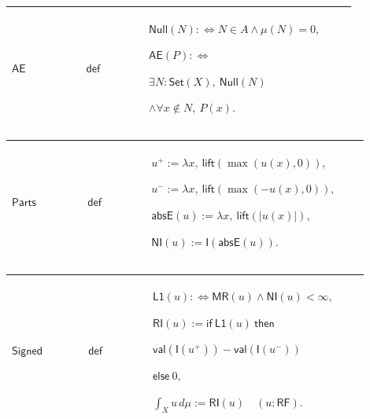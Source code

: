 \documentclass[12pt,reqno]{amsart}
\theoremstyle{blueplain}
\numberwithin{equation}{section}
\begin{document}
{\scriptsize \setlength{\parskip}{0pt}\nointerlineskip
\noindent 
\begin{tabular}{|@{}>{\centering\arraybackslash}m{0.19251\linewidth}|>{\centering\arraybackslash}m{0.16845\linewidth}|>{\centering\arraybackslash}m{0.53904\linewidth}|}
\hline
\hypertarget{dctdef:AE}{$\displaystyle \mathsf{AE}$} & $\displaystyle 
\mathsf{def}$ & $\displaystyle \mathsf{Null}(N):\Longleftrightarrow N\in
A\land\mu(N)=0,$\par$\displaystyle \mathsf{AE}(P):\Longleftrightarrow$\par$%
\displaystyle \exists N:\mathsf{Set}(X),\ \mathsf{Null}(N)$\par$%
\displaystyle \land\forall x\notin N,\ P(x).$ \\ \hline
\end{tabular}%
}

{\scriptsize \setlength{\parskip}{0pt}\nointerlineskip
\noindent 
\begin{tabular}{|@{}>{\centering\arraybackslash}m{0.19251\linewidth}|>{\centering\arraybackslash}m{0.16845\linewidth}|>{\centering\arraybackslash}m{0.53904\linewidth}|}
\hline
\hypertarget{dctdef:Parts}{$\displaystyle \mathsf{Parts}$} & $\displaystyle 
\mathsf{def}$ & $\displaystyle u^+:=\lambda x,\ \mathsf{lift}(\max(u(x),0)),$%
\par$\displaystyle u^-:=\lambda x,\ \mathsf{lift}(\max(-u(x),0)),$\par$%
\displaystyle \mathsf{absE}(u):=\lambda x,\ \mathsf{lift}(|u(x)|),$\par$%
\displaystyle \mathsf{NI}(u):=\mathsf{I}(\mathsf{absE}(u)).$ \\ \hline
\end{tabular}%
}

{\scriptsize \setlength{\parskip}{0pt}\nointerlineskip
\noindent 
\begin{tabular}{|@{}>{\centering\arraybackslash}m{0.19251\linewidth}|>{\centering\arraybackslash}m{0.16845\linewidth}|>{\centering\arraybackslash}m{0.53904\linewidth}|}
\hline
\hypertarget{dctdef:Signed}{$\displaystyle \mathsf{Signed}$} & $%
\displaystyle \mathsf{def}$ & $\displaystyle \mathsf{L1}(u):%
\Longleftrightarrow\mathsf{MR}(u)\land\mathsf{NI}(u)<\infty,$\par$%
\displaystyle \mathsf{RI}(u):=\mathsf{if}\ \mathsf{L1}(u)\ \mathsf{then}$\par%
$\displaystyle \mathsf{val}(\mathsf{I}(u^+))-\mathsf{val}(\mathsf{I}(u^-))$%
\par$\displaystyle \mathsf{else}\ 0,$\par$\displaystyle \int_Xu\,d\mu:=%
\mathsf{RI}(u)\quad(u:\mathsf{RF}).$ \\ \hline
\end{tabular}%
}
\end{document}
